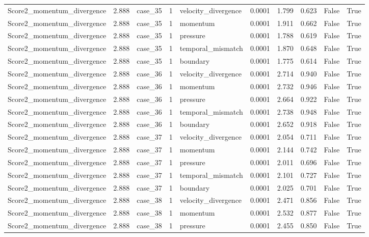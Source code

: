\begin{longtable}{llllllllll}
Score2\_momentum\_divergence & 2.888 & case\_35 & 1 & velocity\_divergence & 0.0001 & 1.799 & 0.623 & False & True \\
Score2\_momentum\_divergence & 2.888 & case\_35 & 1 & momentum & 0.0001 & 1.911 & 0.662 & False & True \\
Score2\_momentum\_divergence & 2.888 & case\_35 & 1 & pressure & 0.0001 & 1.788 & 0.619 & False & True \\
Score2\_momentum\_divergence & 2.888 & case\_35 & 1 & temporal\_mismatch & 0.0001 & 1.870 & 0.648 & False & True \\
Score2\_momentum\_divergence & 2.888 & case\_35 & 1 & boundary & 0.0001 & 1.775 & 0.614 & False & True \\
Score2\_momentum\_divergence & 2.888 & case\_36 & 1 & velocity\_divergence & 0.0001 & 2.714 & 0.940 & False & True \\
Score2\_momentum\_divergence & 2.888 & case\_36 & 1 & momentum & 0.0001 & 2.732 & 0.946 & False & True \\
Score2\_momentum\_divergence & 2.888 & case\_36 & 1 & pressure & 0.0001 & 2.664 & 0.922 & False & True \\
Score2\_momentum\_divergence & 2.888 & case\_36 & 1 & temporal\_mismatch & 0.0001 & 2.738 & 0.948 & False & True \\
Score2\_momentum\_divergence & 2.888 & case\_36 & 1 & boundary & 0.0001 & 2.652 & 0.918 & False & True \\
Score2\_momentum\_divergence & 2.888 & case\_37 & 1 & velocity\_divergence & 0.0001 & 2.054 & 0.711 & False & True \\
Score2\_momentum\_divergence & 2.888 & case\_37 & 1 & momentum & 0.0001 & 2.144 & 0.742 & False & True \\
Score2\_momentum\_divergence & 2.888 & case\_37 & 1 & pressure & 0.0001 & 2.011 & 0.696 & False & True \\
Score2\_momentum\_divergence & 2.888 & case\_37 & 1 & temporal\_mismatch & 0.0001 & 2.101 & 0.727 & False & True \\
Score2\_momentum\_divergence & 2.888 & case\_37 & 1 & boundary & 0.0001 & 2.025 & 0.701 & False & True \\
Score2\_momentum\_divergence & 2.888 & case\_38 & 1 & velocity\_divergence & 0.0001 & 2.471 & 0.856 & False & True \\
Score2\_momentum\_divergence & 2.888 & case\_38 & 1 & momentum & 0.0001 & 2.532 & 0.877 & False & True \\
Score2\_momentum\_divergence & 2.888 & case\_38 & 1 & pressure & 0.0001 & 2.455 & 0.850 & False & True \\

\end{longtable}
